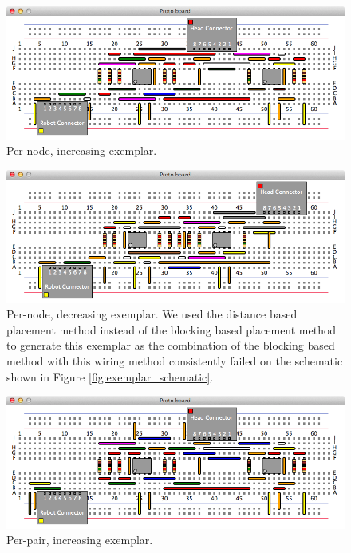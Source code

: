 \begin{figure}[H]
\begin{center}
\includegraphics[width=\textwidth]{Images/exemplar_per_node_increasing.png}
\caption{Per-node, increasing exemplar.}
\end{center}
\end{figure}

\begin{figure}[H]
\begin{center}
\includegraphics[width=\textwidth]{Images/exemplar_per_node_decreasing.png}
\caption{Per-node, decreasing exemplar.
We used the distance based placement method instead of the blocking based
placement method to generate this exemplar as the
combination of the blocking based method with this wiring method consistently
failed on the schematic shown in Figure \ref{fig:exemplar_schematic}.}
\end{center}
\end{figure}

\begin{figure}[H]
\begin{center}
\includegraphics[width=\textwidth]{Images/exemplar_per_pair_increasing.png}
\caption{Per-pair, increasing exemplar.}
\end{center}
\end{figure}

